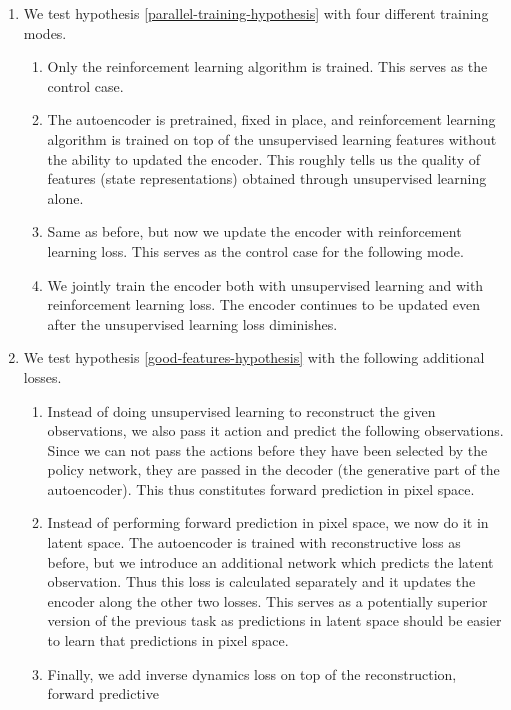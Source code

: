 \begin{enumerate}
		\item We test hypothesis \ref{parallel-training-hypothesis} with four different training modes.
		\begin{enumerate}
				\item Only the reinforcement learning algorithm is trained. This serves as 
						the control case.
				\item The autoencoder is pretrained, fixed in place, and reinforcement learning
						algorithm is trained on top of the unsupervised learning features
						without the ability to updated the encoder. 
						This roughly tells us the quality of features (state representations) 
						obtained through unsupervised learning alone. \label{test-ae-fixed}
				\item Same as before, but now we update the encoder with reinforcement learning loss.
						This serves as the control case for the following mode.
				\item We jointly train the encoder both with unsupervised learning and with
						reinforcement learning loss. The encoder continues to be updated
						even after the unsupervised learning loss diminishes.
		\end{enumerate}
\item We test hypothesis \ref{good-features-hypothesis} with the following additional losses.
		\begin{enumerate}
				\item Instead of doing unsupervised learning to reconstruct the given observations,
						we also pass it action and predict the following observations.
						Since we can not pass the actions before they have been selected by the policy network,
						they are passed in the decoder (the generative part of the autoencoder).
						This thus constitutes forward prediction in pixel space.
				\item Instead of performing forward prediction in pixel space, we now do it in latent space.
						The autoencoder is trained with reconstructive loss as before, but we introduce
						an additional network which predicts the latent observation. Thus this loss is calculated
						separately and it updates the encoder along the other two losses.
						This serves as a potentially superior version of the previous task as predictions
						in latent space should be easier to learn that predictions in pixel space.
				\item Finally, we add inverse dynamics loss on top of the reconstruction, forward predictive 

\end{enumerate}
\end{enumerate}
